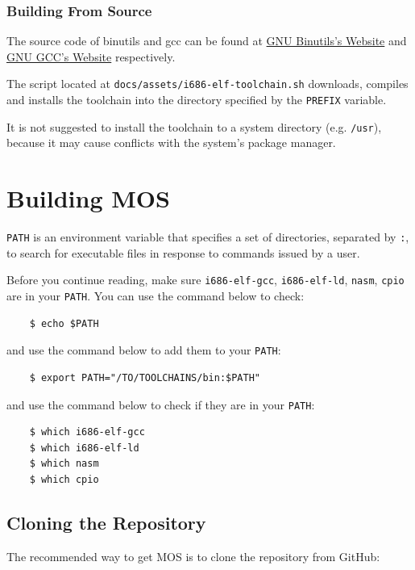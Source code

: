 \subsubsection{Building From Source}

The source code of binutils and gcc can be found at
\href{https://www.gnu.org/software/binutils}{GNU Binutils's Website} and
\href{https://gcc.gnu.org}{GNU GCC's Website} respectively.

The script located at \texttt{docs/assets/i686-elf-toolchain.sh} downloads, compiles and
installs the toolchain into the directory specified by the \texttt{PREFIX} variable.

It is not suggested to install the toolchain to a system directory (e.g. \texttt{/usr}),
because it may cause conflicts with the system's package manager.

\section{Building MOS}

\begin{note}
    \item \texttt{PATH} is an environment variable that specifies a set of directories, separated
    by \texttt{:}, to search for executable files in response to commands issued by a user.
    \item Before you continue reading, make sure \texttt{i686-elf-gcc}, \texttt{i686-elf-ld},
    \texttt{nasm}, \texttt{cpio} are in your \texttt{PATH}. You can use the command below to check:
    \begin{verbatim}
    $ echo $PATH
    \end{verbatim}
    and use the command below to add them to your \texttt{PATH}:
    \begin{verbatim}
    $ export PATH="/TO/TOOLCHAINS/bin:$PATH"
    \end{verbatim}
    and use the command below to check if they are in your \texttt{PATH}:
    \begin{verbatim}
    $ which i686-elf-gcc
    $ which i686-elf-ld
    $ which nasm
    $ which cpio
    \end{verbatim}
\end{note}

\subsection{Cloning the Repository}

The recommended way to get MOS is to clone the repository from GitHub:


